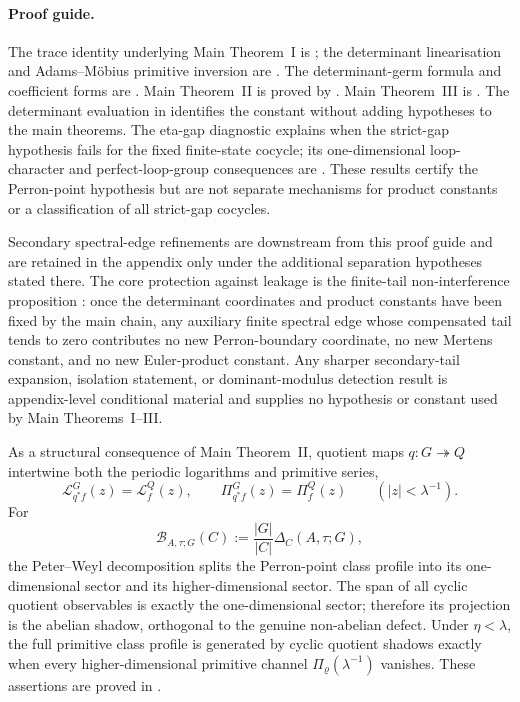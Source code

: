 \documentclass[11pt,a4paper]{amsart}
\theoremstyle{plain}
\theoremstyle{definition}
\theoremstyle{remark}
\begin{document}
\paragraph{Proof guide.}
  The trace identity underlying Main Theorem~I is
  ; the determinant linearisation and
  Adams--M\"obius primitive inversion are
  .
  The determinant-germ formula and coefficient forms are
  .  Main Theorem~II is proved by
  .  Main Theorem~III is
  . The determinant evaluation in
  identifies the constant without adding hypotheses to the main theorems.
  The eta-gap diagnostic  explains when the
  strict-gap hypothesis fails for the fixed finite-state cocycle; its one-dimensional loop-character and
  perfect-loop-group consequences are
  .
  These results certify the Perron-point hypothesis but are not separate
  mechanisms for product constants or a classification of all strict-gap
  cocycles.

  Secondary spectral-edge refinements are downstream from this proof guide and
  are retained in the appendix only under the additional separation hypotheses
  stated there.
  The core protection against leakage is the finite-tail non-interference
  proposition : once the
  determinant coordinates and product constants have been fixed by the main
  chain, any auxiliary finite spectral edge whose compensated tail tends to
  zero contributes no new Perron-boundary coordinate, no new Mertens constant,
  and no new Euler-product constant.  Any sharper secondary-tail expansion,
  isolation statement, or dominant-modulus detection result is appendix-level
  conditional material and supplies no hypothesis or constant used by Main
  Theorems~I--III.

As a structural consequence of Main Theorem~II, quotient maps
\(q:G\twoheadrightarrow Q\) intertwine both the periodic logarithms and
primitive series,
\[
  \mathcal L_{q^\ast f}^{G}(z)=\mathcal L_f^{Q}(z),
  \qquad
  \Pi_{q^\ast f}^{G}(z)=\Pi_f^{Q}(z)
  \qquad(|z|<\lambda^{-1}).
\]
For
\[
  \mathcal B_{A,\tau;G}(C):=\frac{|G|}{|C|}\Delta_C(A,\tau;G),
\]
the Peter--Weyl decomposition splits the Perron-point class profile into
its one-dimensional sector and its higher-dimensional sector. The span of
all cyclic quotient observables is exactly the one-dimensional sector;
therefore its projection is the abelian shadow, orthogonal to the genuine
non-abelian defect. Under \(\eta<\lambda\), the full primitive class
profile is generated by cyclic quotient shadows exactly when every
higher-dimensional primitive channel
\(\Pi_\varrho(\lambda^{-1})\) vanishes. These assertions are proved in
.
\end{document}
